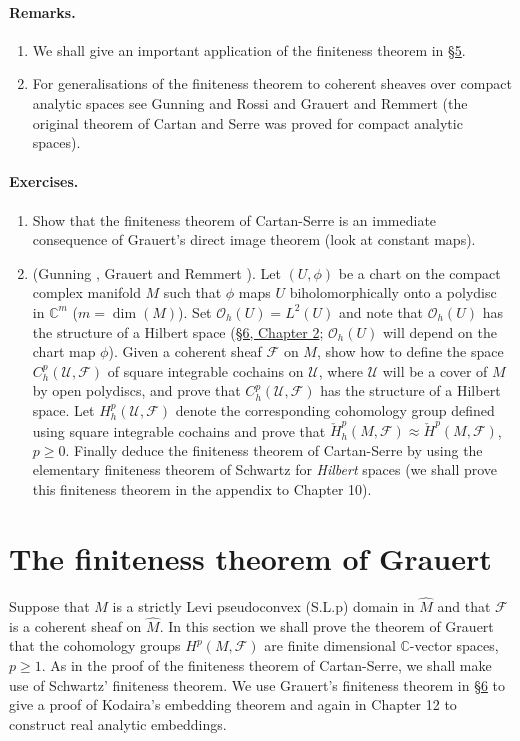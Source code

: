 \paragraph{Remarks.}
\begin{enumerate}[label=\arabic*.]
\item We shall give an important application of the finiteness theorem in \hyperref[sec:7:5]{\S5}.
\item For generalisations of the finiteness theorem to coherent sheaves over compact analytic spaces see Gunning and Rossi \cite{bib:II:gunning-r-c-and-rossi-h:1} and Grauert and Remmert \cite{bib:II:grauert-h-and-remmert-r:1} (the original theorem of Cartan and Serre was proved for compact analytic spaces).
\end{enumerate}
\paragraph{Exercises.}
\begin{enumerate}[label=\arabic*.]
\item Show that the finiteness theorem of Cartan-Serre is an immediate consequence of Grauert's direct image theorem (look at constant maps).
\item[2*.] (Gunning \cite{bib:II:gunning-r-c:2}, Grauert and Remmert \cite{bib:II:grauert-h-and-remmert-r:1}). Let $(U,\phi)$ be a chart on the compact complex manifold $M$ such that $\phi$ maps $U$ biholomorphically onto a polydisc in $\mathbb C^m$ ($m=\dim(M)$). Set $\mathcal O_h(U)=L^2(U)$ and note that $\mathcal O_h(U)$ has the structure of a Hilbert space (\hyperref[sec:2:6]{\S6, Chapter 2}; $\mathcal O_h(U)$ will depend on the chart map $\phi$). Given a coherent sheaf $\mathcal F$ on $M$, show how to define the space $C_h^p(\mathcal U,\mathcal F)$ of square integrable cochains on $\mathcal U$, where $\mathcal U$ will be a cover of $M$ by open polydiscs, and prove that $C_h^p(\mathcal U,\mathcal F)$ has the structure of a Hilbert space. Let $H_h^p(\mathcal U,\mathcal F)$ denote the corresponding cohomology group defined using square integrable cochains and prove that $\check H_h^p(M,\mathcal F)\approx\check H^p(M,\mathcal F)$, $p\geq0$. Finally deduce the finiteness theorem of Cartan-Serre by using the elementary finiteness theorem of Schwartz for \emph{Hilbert} spaces (we shall prove this finiteness theorem in the appendix to Chapter 10).
\end{enumerate}
\section{The finiteness theorem of Grauert}\label{sec:7:4}
Suppose that $M$ is a strictly Levi pseudoconvex (S.L.p) domain in $\widehat M$ and that $\mathcal F$ is a coherent sheaf on $\widehat M$. In this section we shall prove the theorem of Grauert that the cohomology groups $H^p(M,\mathcal F)$ are finite dimensional $\mathbb C$-vector spaces, $p\geq1$. As in the proof of the finiteness theorem of Cartan-Serre, we shall make use of Schwartz' finiteness theorem. We use Grauert's finiteness theorem in \hyperref[sec:7:6]{\S6} to give
 a proof of Kodaira's embedding theorem and again in Chapter 12 to construct real analytic embeddings.

